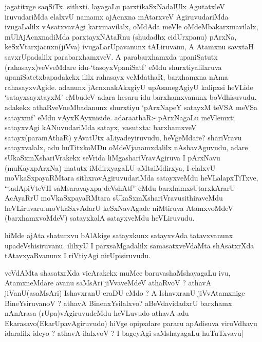 

\begin{artha}
jagatitxge saqSiTx. sithxti. layagaLu parxtikaSxNadalUlx AgutatxleV
iruvudariMda elalxvU namamx ajAcnxna mAtarxveV AgiruvudariMda
ivugaLalilx vAsatxvavAgi karxmavilalx, oMdAda meVle
oMdeMbakarxmavilalx, mUlAjAcnxnadiMda parxtayxNAtaRnu (shudadhx
cidUrxpanu) pArxNa, keSxVtarxjacnxn(jiVva) ivugaLarUpavanunx
tALiruvanu, A Atamxnu savxtaH savxrUpadalilx parabarxhamxveV. A
parabarxhamxda upaniSatutx (rahasayx)veVveMdare idu-`tasoyxVpaniSatf'
eMdu shurxtiyalilxruva upaniSatetxbapadakekx ililx rahasayx veMdathaR,
barxhamxna nAma rahasayxvAgide. adanunx jAcnxnakAkxgiyU upAsanegAgiyU
kalipxsi heVLide `satayxsayxtayxM' eMbudeV adara hesaru  idu
barxhamxvanunx boVdhisuvudu, adakekx athaRveVneMbadanunx shurxtiyu
`pArxNapeY satayxM teVSA meVSa satayxmf' eMdu
vAyxKAyxniside. adaraathaR:- pArxNagaLu meVlemxti satayxvAgi
kANuvudariMda satayx, vasutxta: barxhamxveV satayx(paramAthaR)
yAvatUtx aLiyadeyiruvudu, heVgeMdare? shariVravu satayxvalalx, adu
huTitxkoMDu oMdeVjanamxdalilx nAshavAguvudu, adare
sUkaSxmXshariVrakekx seVrida liMgashariVravAgiruva I pArxNavu
(muKayxpArxNa) matutx iMdirxyagaLU aMtaiMdirxya, I elalxvU
moVkaSxpayaRMtara sithxravAgiruvudariMda satayxveMdu heVLalapxTiTxve,
``tadApiVteVH saMsaravayxpa deVshAtf'' eMdu
barxhamxsUtarxkArarU AcAyaRrU moVkaSxpayaRMtara
sUkaSxmXshariVravusithiraveMdu heVLiruvaru.moVkaSxvAdarU keSxNavAgade
niMtiruva AtamxvoMdeV (barxhamxvoMdeV) satayxkalA satayxveMdu
heVLiruvudu.  
\end{artha}

\begin{artha}

hiMde ajAta shaturxvu bAlAkige satayxkunx satayxvAda tatavxvanunx
upadeVshisiruvanu. ililxyU I parxsaMgadalilx samasatxveVdaMta
shAsatxrXda tAtavxyaRvanunx I riVtiyAgi nirUpisiruvudu.
\end{artha}



\begin{artha}
veVdAMta shasatxrXda vicArakekx muMce baruvashaMshayagaLu ivu,
AtamxneMdare avanu saMsAri jiVvaveMdeV athaRvoV ? athavA
jiVanU(asaMsAri) IshavxranU eraDU eMdo ? A IshavxranU jiVvAtamxnige
BineYsiruvanoV ? athavA BinenxYsilalxvo? aBeVdavidadxrU barxhamx
nAnArasa (rUpa)vAgiruvudeMdu heVLuvudo athavA adu
Ekarasavo(EkarUpavAgiruvudo) hiVge opipxdare pararu apAdisuva
viroVdhavu idaralilx ideyo ? athavA ilalxvoV ? I bageyAgi saMshayagaLu huTuTxvavu|
\end{artha}

